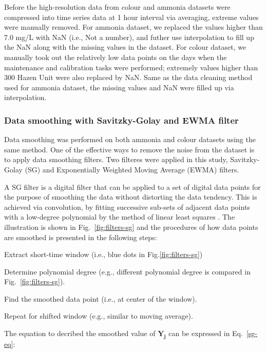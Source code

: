 Before the high-resolution data from colour and ammonia datasets were compressed into time series data at 1 hour interval via averaging, extreme values were manually removed. For ammonia dataset, we replaced the values higher than 7.0 mg/L with NaN (i.e., Not a number), and futher use interpolation to fill up the NaN along with the missing values in the dataset. For colour dataset, we manually took out the relatively low data points on the days when the maintenance and calibration tasks were performed; extremely values higher than 300 Hazen Unit were also replaced by NaN. Same as the data cleaning method used for ammonia dataset, the missing values and NaN were filled up via interpolation.

\subsubsection{Data smoothing with Savitzky-Golay and EWMA filter}
Data smoothing was performed on both ammonia and colour datasets using the same method. One of the effective ways to remove the noise from the dataset is to apply data smoothing filters. Two filteres were applied in this study, Savitzky-Golay (SG) and Exponentially Weighted Moving Average (EWMA) filters.

A SG filter is a digital filter that can be applied to a set of digital data points for the purpose of smoothing the data without distorting the data tendency. This is achieved via convolution, by fitting successive sub-sets of adjacent data points with a low-degree polynomial by the method of linear least squares \citep{wikipediaSavitzkyGolayFilter2022}. The illustration is shown in Fig.~\ref{fig:filters-sg} and the procedures of how data points are smoothed is presented in the following steps:

\noindent
\begin{myenumerate}
    \item Extract short-time window (i.e., blue dots in Fig.\ref{fig:filters-sg})
    \item Determine polynomial degree (e.g., different polynomial degree is compared in Fig.~\ref{fig:filters-sg}).
    \item Find the smoothed data point (i.e., at center of the window).
    \item Repeat for shifted window (e.g., similar to moving average).
\end{myenumerate}

The equation to decribed the smoothed value of $\bm{Y_j}$ can be expressed in Eq.~\ref{sg-eq}:


